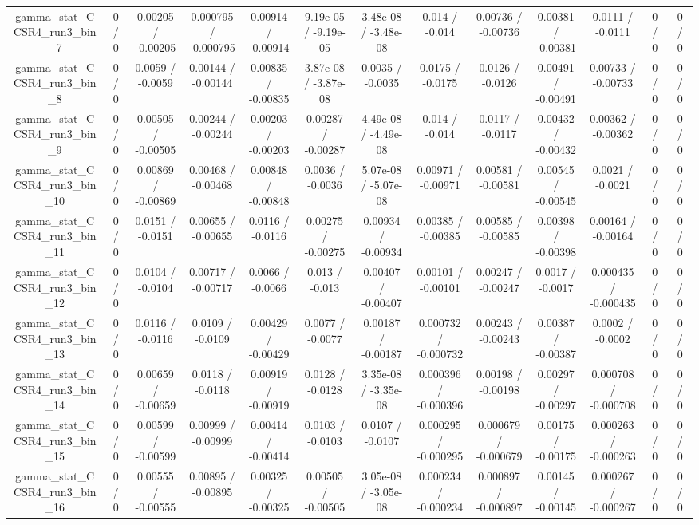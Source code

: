 \documentclass[10pt]{article}
\begin{document}
\begin{table}[htbp]
\begin{center}
\begin{tabular}{|c|c|c|c|c|c|c|c|c|c|c|c|c|}
  gamma_stat_CCSR4_run3_bin_7 & 0 / 0 & 0.00205 / -0.00205 & 0.000795 / -0.000795 & 0.00914 / -0.00914 & 9.19e-05 / -9.19e-05 & 3.48e-08 / -3.48e-08 & 0.014 / -0.014 & 0.00736 / -0.00736 & 0.00381 / -0.00381 & 0.0111 / -0.0111 & 0 / 0 & 0 / 0 \\ 
  gamma_stat_CCSR4_run3_bin_8 & 0 / 0 & 0.0059 / -0.0059 & 0.00144 / -0.00144 & 0.00835 / -0.00835 & 3.87e-08 / -3.87e-08 & 0.0035 / -0.0035 & 0.0175 / -0.0175 & 0.0126 / -0.0126 & 0.00491 / -0.00491 & 0.00733 / -0.00733 & 0 / 0 & 0 / 0 \\ 
  gamma_stat_CCSR4_run3_bin_9 & 0 / 0 & 0.00505 / -0.00505 & 0.00244 / -0.00244 & 0.00203 / -0.00203 & 0.00287 / -0.00287 & 4.49e-08 / -4.49e-08 & 0.014 / -0.014 & 0.0117 / -0.0117 & 0.00432 / -0.00432 & 0.00362 / -0.00362 & 0 / 0 & 0 / 0 \\ 
  gamma_stat_CCSR4_run3_bin_10 & 0 / 0 & 0.00869 / -0.00869 & 0.00468 / -0.00468 & 0.00848 / -0.00848 & 0.0036 / -0.0036 & 5.07e-08 / -5.07e-08 & 0.00971 / -0.00971 & 0.00581 / -0.00581 & 0.00545 / -0.00545 & 0.0021 / -0.0021 & 0 / 0 & 0 / 0 \\ 
  gamma_stat_CCSR4_run3_bin_11 & 0 / 0 & 0.0151 / -0.0151 & 0.00655 / -0.00655 & 0.0116 / -0.0116 & 0.00275 / -0.00275 & 0.00934 / -0.00934 & 0.00385 / -0.00385 & 0.00585 / -0.00585 & 0.00398 / -0.00398 & 0.00164 / -0.00164 & 0 / 0 & 0 / 0 \\ 
  gamma_stat_CCSR4_run3_bin_12 & 0 / 0 & 0.0104 / -0.0104 & 0.00717 / -0.00717 & 0.0066 / -0.0066 & 0.013 / -0.013 & 0.00407 / -0.00407 & 0.00101 / -0.00101 & 0.00247 / -0.00247 & 0.0017 / -0.0017 & 0.000435 / -0.000435 & 0 / 0 & 0 / 0 \\ 
  gamma_stat_CCSR4_run3_bin_13 & 0 / 0 & 0.0116 / -0.0116 & 0.0109 / -0.0109 & 0.00429 / -0.00429 & 0.0077 / -0.0077 & 0.00187 / -0.00187 & 0.000732 / -0.000732 & 0.00243 / -0.00243 & 0.00387 / -0.00387 & 0.0002 / -0.0002 & 0 / 0 & 0 / 0 \\ 
  gamma_stat_CCSR4_run3_bin_14 & 0 / 0 & 0.00659 / -0.00659 & 0.0118 / -0.0118 & 0.00919 / -0.00919 & 0.0128 / -0.0128 & 3.35e-08 / -3.35e-08 & 0.000396 / -0.000396 & 0.00198 / -0.00198 & 0.00297 / -0.00297 & 0.000708 / -0.000708 & 0 / 0 & 0 / 0 \\ 
  gamma_stat_CCSR4_run3_bin_15 & 0 / 0 & 0.00599 / -0.00599 & 0.00999 / -0.00999 & 0.00414 / -0.00414 & 0.0103 / -0.0103 & 0.0107 / -0.0107 & 0.000295 / -0.000295 & 0.000679 / -0.000679 & 0.00175 / -0.00175 & 0.000263 / -0.000263 & 0 / 0 & 0 / 0 \\ 
  gamma_stat_CCSR4_run3_bin_16 & 0 / 0 & 0.00555 / -0.00555 & 0.00895 / -0.00895 & 0.00325 / -0.00325 & 0.00505 / -0.00505 & 3.05e-08 / -3.05e-08 & 0.000234 / -0.000234 & 0.000897 / -0.000897 & 0.00145 / -0.00145 & 0.000267 / -0.000267 & 0 / 0 & 0 / 0 \\ 

\end{tabular}
\end{center}
\end{table}
\end{document}
